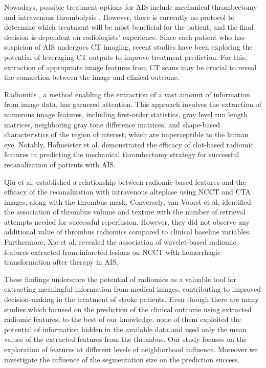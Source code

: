 \documentclass[preprint,12pt]{elsarticle}
\begin{document}
Nowadays, possible treatment options for AIS include mechanical thrombectomy and intravenous thrombolysis \cite{Powers2020}. However, there is currently no protocol to determine which treatment will be most beneficial for the patient, and the final decision is dependent on radiologists' experience. Since each patient who has suspicion of AIS undergoes CT imaging, recent studies have been exploring the potential of leveraging CT outputs to improve treatment prediction. For this, extraction of appropriate image features from CT scans may be crucial to reveal the connection between the image and clinical outcome. 

Radiomics \cite{Qiu2018}, a method enabling the extraction of a vast amount of information from image data, has garnered attention. This approach involves the extraction of numerous image features, including first-order statistics, gray level run length matrices, neighboring gray tone difference matrices, and shape-based characteristics of the region of interest, which are imperceptible to the human eye. Notably, Hofmeister et al. \cite{Hofmeister2020} demonstrated the efficacy of clot-based radiomic features in predicting the mechanical thrombectomy strategy for successful recanalization of patients with AIS.

Qiu et al. \cite{Qiu2018} established a relationship between radiomic-based features and the efficacy of the recanalization with intravenous alteplase using NCCT and CTA images, along with the thrombus mask. Conversely, van Voorst et al. \cite{vanVoorst2022} identified the association of thrombus volume and texture with the number of retrieval attempts needed for successful reperfusion. However, they did not observe any additional value of thrombus radiomics compared to clinical baseline variables. Furthermore, Xie et al. \cite{Xie2022} revealed the association of wavelet-based radiomic features extracted from infarcted lesions on NCCT with hemorrhagic transformation after therapy in AIS. 

These findings underscore the potential of radiomics as a valuable tool for extracting meaningful information from medical images, contributing to improved decision-making in the treatment of stroke patients. Even though there are many studies which focused on the prediction of the clinical outcome using extracted radiomic features, to the best of our knowledge, none of them exploited the potential of information hidden in the available data and used only the mean values of the extracted features from the thrombus. Our study focuses on the exploration of features at different levels of neighborhood influence. Moreover we investigate the influence of the segmentation size on the prediction success.
\end{document}
